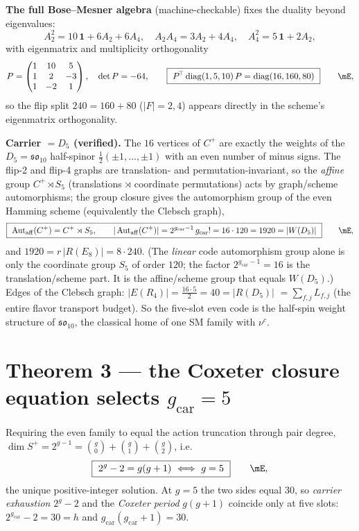 \documentclass[11pt,a4paper]{article}
\newcommand{\gcar}{g_{\mathrm{car}}}
\theoremstyle{definition}
\begin{document}
\noindent\textbf{The full Bose--Mesner algebra} (machine-checkable) fixes the duality beyond
eigenvalues:
\begin{equation}
  A_2^2=10\,\mathbf 1+6A_2+6A_4,\quad A_2A_4=3A_2+4A_4,\quad A_4^2=5\,\mathbf 1+2A_2 ,
\end{equation}
with eigenmatrix and multiplicity orthogonality
\begin{equation}
  P=\begin{pmatrix}1&10&5\\1&2&-3\\1&-2&1\end{pmatrix},\quad \det P=-64,\qquad
  \boxed{\ P^{\!\top}\operatorname{diag}(1,5,10)\,P=\operatorname{diag}(16,160,80)\ }\qquad\mE ,
\end{equation}
so the flip split $240=160+80$ ($|F|=2,4$) appears directly in the scheme's eigenmatrix orthogonality.

\noindent\textbf{Carrier $=D_5$ (verified).} The $16$ vertices of $C^+$ are exactly the weights of the
$D_5=\mathfrak{so}_{10}$ half-spinor $\tfrac12(\pm1,\dots,\pm1)$ with an even number of minus signs.
The flip-2 and flip-4 graphs are translation- and permutation-invariant, so the \emph{affine} group
$C^+\rtimes S_5$ (translations $\rtimes$ coordinate permutations) acts by graph/scheme automorphisms; the
group closure gives the automorphism group of the even Hamming scheme (equivalently the Clebsch graph),
\begin{equation}
  \boxed{\ \operatorname{Aut}_{\mathrm{aff}}(C^+)=C^+\rtimes S_5,\qquad |\operatorname{Aut}_{\mathrm{aff}}(C^+)|=2^{\gcar-1}\,\gcar!=16\cdot120=1920=|W(D_5)|\ }\qquad\mE ,
\end{equation}
and $1920=r\,|R(E_8)|=8\cdot240$. (The \emph{linear} code automorphism group alone is only the
coordinate group $S_5$ of order $120$; the factor $2^{\gcar-1}=16$ is the translation/scheme part. It is
the affine/scheme group that equals $W(D_5)$.) Edges of the Clebsch graph: $|E(R_4)|=\tfrac{16\cdot5}{2}=40=|R(D_5)|$
$=\sum_{f,j}L_{f,j}$ (the entire flavor transport budget). So the five-slot even code is the half-spin
weight structure of $\mathfrak{so}_{10}$, the classical home of one SM family with $\nu^c$.

\section*{Theorem 3 --- the Coxeter closure equation selects $\gcar=5$}
Requiring the even family to equal the action truncation through pair degree,
$\dim S^+=2^{g-1}=\binom g0+\binom g1+\binom g2$, i.e.
\begin{equation}
  \boxed{\ 2^{g}-2=g(g+1)\ \Longleftrightarrow\ g=5\ }\qquad\mE,
\end{equation}
the unique positive-integer solution. At $g=5$ the two sides equal $30$, so
\emph{carrier exhaustion} $2^{g}-2$ and the \emph{Coxeter period} $g(g+1)$ coincide only at five
slots: $2^{\gcar}-2=30=h$ and $\gcar(\gcar+1)=30$.
\end{document}
